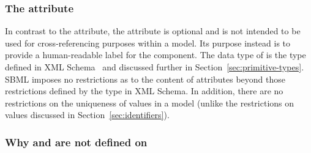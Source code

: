 \subsubsection{The  attribute}
\label{sec:name}

In contrast to the  attribute, the  attribute is
optional and is not intended to be used for cross-referencing
purposes within a model.  Its purpose instead is to provide a
human-readable label for the component.  The data type of 
 is the type  defined in XML
Schema~\citep{biron:2000,thompson:2000} and discussed further in
Section~\ref{sec:primitive-types}.  SBML imposes no restrictions
as to the content of  attributes beyond those restrictions
defined by the  type in XML Schema.
In addition, there are no restrictions on the uniqueness
of  values in a model (unlike the restrictions on
 values discussed in Section~\ref{sec:identifiers}).


\subsubsection{Why  and  are not defined on }
\label{sec:why-not-on-sbase}

